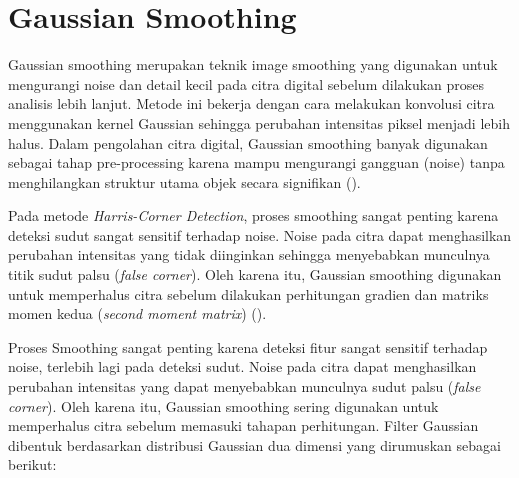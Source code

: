 \section{Gaussian Smoothing}
Gaussian smoothing merupakan teknik image smoothing yang digunakan untuk mengurangi noise dan detail kecil pada citra digital sebelum dilakukan proses analisis lebih lanjut.
Metode ini bekerja dengan cara melakukan konvolusi citra menggunakan kernel Gaussian sehingga perubahan intensitas piksel menjadi lebih halus.
Dalam pengolahan citra digital, Gaussian smoothing banyak digunakan sebagai tahap pre-processing karena mampu mengurangi gangguan (noise) tanpa menghilangkan struktur utama objek secara signifikan (\cite{Gonzalez2018}).

Pada metode \emph{Harris-Corner Detection}, proses smoothing sangat penting karena deteksi sudut sangat sensitif terhadap noise. Noise pada citra dapat menghasilkan perubahan intensitas yang tidak diinginkan sehingga menyebabkan munculnya titik sudut palsu (\emph{false corner}). 
Oleh karena itu, Gaussian smoothing digunakan untuk memperhalus citra sebelum dilakukan perhitungan gradien dan matriks momen kedua (\emph{second moment matrix}) (\cite{Sanchez2018}).

Proses Smoothing sangat penting karena deteksi fitur sangat sensitif terhadap noise, terlebih lagi pada deteksi sudut. Noise pada citra dapat menghasilkan perubahan intensitas yang dapat menyebabkan munculnya sudut palsu (\emph{false corner}). Oleh karena itu, Gaussian smoothing sering digunakan untuk memperhalus citra sebelum memasuki tahapan perhitungan.
Filter Gaussian dibentuk berdasarkan distribusi Gaussian dua dimensi yang dirumuskan sebagai berikut:


